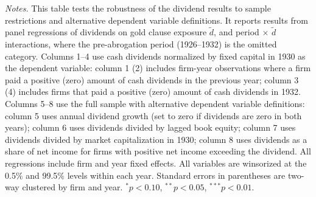 \begin{landscape}
\begin{table}[p]
\vspace*{3mm} \justifying \noindent
\scriptsize{\textit{Notes.} This table tests the robustness of the dividend results to sample restrictions and alternative dependent variable definitions. It reports results from panel regressions of dividends on gold clause exposure $\tilde{d}$, and period $\times$ $\tilde{d}$ interactions, where the pre-abrogation period (1926--1932) is the omitted category. Columns 1--4 use cash dividends normalized by fixed capital in 1930 as the dependent variable: column 1 (2) includes firm-year observations where a firm paid a positive (zero) amount of cash dividends in the previous year; column 3 (4) includes firms that paid a positive (zero) amount of cash dividends in 1932. Columns 5--8 use the full sample with alternative dependent variable definitions: column 5 uses annual dividend growth (set to zero if dividends are zero in both years); column 6 uses dividends divided by lagged book equity; column 7 uses dividends divided by market capitalization in 1930; column 8 uses dividends as a share of net income for firms with positive net income exceeding the dividend. All regressions include firm and year fixed effects. All variables are winsorized at the 0.5\% and 99.5\% levels within each year. Standard errors in parentheses are two-way clustered by firm and year. $^{*}p<0.10$, $^{**}p<0.05$, $^{***}p<0.01$.}
\end{table}
\end{landscape}